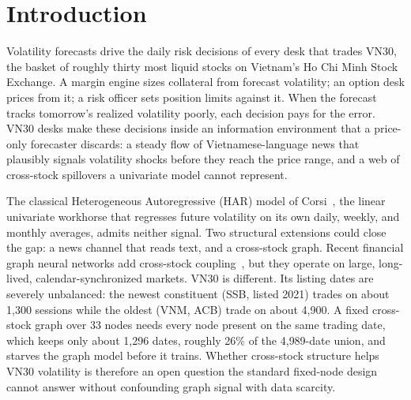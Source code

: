 \documentclass[runningheads]{llncs}
\newcommand{\ntick}{33}
\begin{document}
\begin{abstract}
\end{abstract}
%
\section{Introduction}
\label{sec:intro}
Volatility forecasts drive the daily risk decisions of every desk that trades VN30, the basket of
roughly thirty most liquid stocks on Vietnam's Ho Chi Minh Stock Exchange. A margin engine sizes
collateral from forecast volatility; an option desk prices from it; a risk officer sets position limits
against it. When the forecast tracks tomorrow's realized volatility poorly, each decision pays for the
error. VN30 desks make these decisions inside an information environment that a price-only forecaster
discards: a steady flow of Vietnamese-language news that plausibly signals volatility shocks before they
reach the price range, and a web of cross-stock spillovers a univariate model cannot represent.

The classical Heterogeneous Autoregressive (HAR) model of Corsi~\cite{corsi2009}, the linear univariate
workhorse that regresses future volatility on its own daily, weekly, and monthly averages, admits
neither signal. Two structural extensions could close the gap: a news channel that reads text, and a
cross-stock graph. Recent financial graph neural networks add cross-stock
coupling~\cite{velickovic2018,chen2022,zhang2025gnnhar}, but they operate on large, long-lived,
calendar-synchronized markets. VN30 is different. Its listing dates are severely unbalanced: the newest
constituent (SSB, listed 2021) trades on about 1{,}300 sessions while the oldest (VNM, ACB) trade on
about 4{,}900. A fixed cross-stock graph over \ntick{} nodes needs every node present on the same
trading date, which keeps only about 1{,}296 dates, roughly 26\% of the 4{,}989-date union, and starves
the graph model before it trains. Whether cross-stock structure helps VN30 volatility is therefore an
open question the standard fixed-node design cannot answer without confounding graph signal with data
scarcity.
\end{document}

